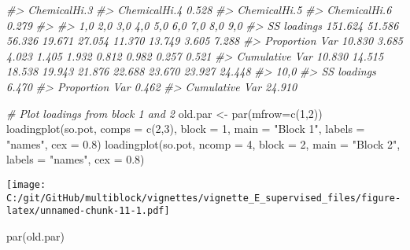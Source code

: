 \documentclass[
]{article}
\newenvironment{Shaded}{\begin{snugshade}}{\end{snugshade}}
\newcommand{\AttributeTok}[1]{\textcolor[rgb]{0.77,0.63,0.00}{#1}}
\newcommand{\CommentTok}[1]{\textcolor[rgb]{0.56,0.35,0.01}{\textit{#1}}}
\newcommand{\DecValTok}[1]{\textcolor[rgb]{0.00,0.00,0.81}{#1}}
\newcommand{\FloatTok}[1]{\textcolor[rgb]{0.00,0.00,0.81}{#1}}
\newcommand{\FunctionTok}[1]{\textcolor[rgb]{0.00,0.00,0.00}{#1}}
\newcommand{\NormalTok}[1]{#1}
\newcommand{\OtherTok}[1]{\textcolor[rgb]{0.56,0.35,0.01}{#1}}
\newcommand{\StringTok}[1]{\textcolor[rgb]{0.31,0.60,0.02}{#1}}
\begin{document}
\begin{Shaded}
\begin{Highlighting}[]
\CommentTok{\#\textgreater{} ChemicalHi.3       }
\CommentTok{\#\textgreater{} ChemicalHi.4  0.528}
\CommentTok{\#\textgreater{} ChemicalHi.5       }
\CommentTok{\#\textgreater{} ChemicalHi.6  0.279}
\CommentTok{\#\textgreater{} }
\CommentTok{\#\textgreater{}                    1,0    2,0    3,0    4,0    5,0    6,0    7,0    8,0    9,0}
\CommentTok{\#\textgreater{} SS loadings    151.624 51.586 56.326 19.671 27.054 11.370 13.749  3.605  7.288}
\CommentTok{\#\textgreater{} Proportion Var  10.830  3.685  4.023  1.405  1.932  0.812  0.982  0.257  0.521}
\CommentTok{\#\textgreater{} Cumulative Var  10.830 14.515 18.538 19.943 21.876 22.688 23.670 23.927 24.448}
\CommentTok{\#\textgreater{}                  10,0}
\CommentTok{\#\textgreater{} SS loadings     6.470}
\CommentTok{\#\textgreater{} Proportion Var  0.462}
\CommentTok{\#\textgreater{} Cumulative Var 24.910}
\end{Highlighting}
\end{Shaded}

\begin{Shaded}
\begin{Highlighting}[]
\CommentTok{\# Plot loadings from block 1 and 2}
\NormalTok{old.par }\OtherTok{\textless{}{-}} \FunctionTok{par}\NormalTok{(}\AttributeTok{mfrow=}\FunctionTok{c}\NormalTok{(}\DecValTok{1}\NormalTok{,}\DecValTok{2}\NormalTok{))}
\FunctionTok{loadingplot}\NormalTok{(so.pot, }\AttributeTok{comps =} \FunctionTok{c}\NormalTok{(}\DecValTok{2}\NormalTok{,}\DecValTok{3}\NormalTok{), }\AttributeTok{block =} \DecValTok{1}\NormalTok{, }\AttributeTok{main =} \StringTok{"Block 1"}\NormalTok{, }\AttributeTok{labels =} \StringTok{"names"}\NormalTok{, }\AttributeTok{cex =} \FloatTok{0.8}\NormalTok{)}
\FunctionTok{loadingplot}\NormalTok{(so.pot, }\AttributeTok{ncomp =} \DecValTok{4}\NormalTok{, }\AttributeTok{block =} \DecValTok{2}\NormalTok{, }\AttributeTok{main =} \StringTok{"Block 2"}\NormalTok{, }\AttributeTok{labels =} \StringTok{"names"}\NormalTok{, }\AttributeTok{cex =} \FloatTok{0.8}\NormalTok{)}
\end{Highlighting}
\end{Shaded}

\texttt{[image: C:/git/GitHub/multiblock/vignettes/vignette\_E\_supervised\_files/figure-latex/unnamed-chunk-11-1.pdf]}

\begin{Shaded}
\begin{Highlighting}[]
\FunctionTok{par}\NormalTok{(old.par)}
\end{Highlighting}
\end{Shaded}
\end{document}
